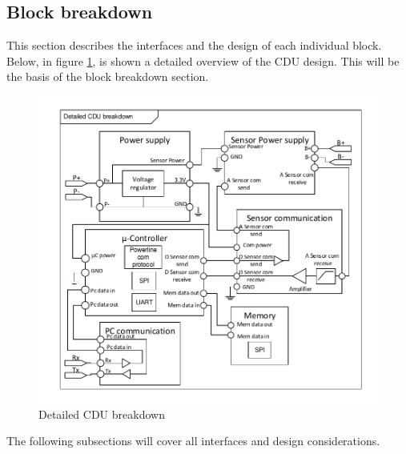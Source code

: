 \subsection{Block breakdown}
This section describes the interfaces and the design of each individual block.\\
Below, in figure \ref{fig:detailedCDU}, is shown a detailed overview of the CDU design. This will be the basis of the block breakdown section.
\begin{figure}[H]
	\centering
	\includegraphics[width=1\textwidth]{billeder/detailedCDU}
	\caption{Detailed CDU breakdown}
	\label{fig:detailedCDU}
\end{figure}

The following subsections will cover all interfaces and design considerations.
